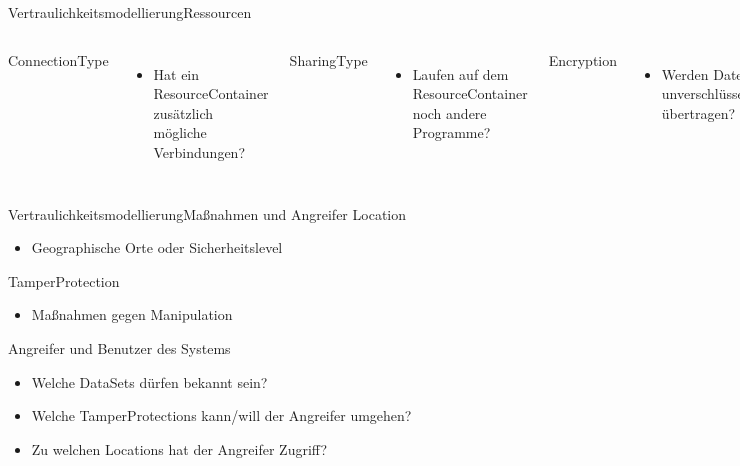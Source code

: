 \documentclass{sdqbeamer}
\begin{document}
\begin{frame}{Vertraulichkeitsmodellierung}{Ressourcen}
	\begin{columns}
ConnectionType
	\begin{itemize}
		\item Hat ein ResourceContainer zusätzlich mögliche Verbindungen?
	\end{itemize}
\vspace{0.05\textheight}
SharingType
\begin{itemize}
	\item Laufen auf dem ResourceContainer noch andere Programme?
\end{itemize}
\vspace{0.05\textheight}
Encryption
\begin{itemize}
	\item Werden Daten unverschlüsselt übertragen?
\end{itemize}
\end{columns}
\end{frame}	

\begin{frame}{Vertraulichkeitsmodellierung}{Maßnahmen und Angreifer}
		Location
		\begin{itemize}
			\item Geographische Orte oder Sicherheitslevel
		\end{itemize}
		\vspace{0.05\textheight}
		TamperProtection
		\begin{itemize}
			\item Maßnahmen gegen Manipulation
		\end{itemize}
	\vspace{0.05\textheight}
	Angreifer und Benutzer des Systems
	\begin{itemize}
		\item Welche DataSets dürfen bekannt sein?
		\item Welche TamperProtections kann/will der Angreifer umgehen?
		\item Zu welchen Locations hat der Angreifer Zugriff?
	\end{itemize}
\end{frame}	
\end{document}
